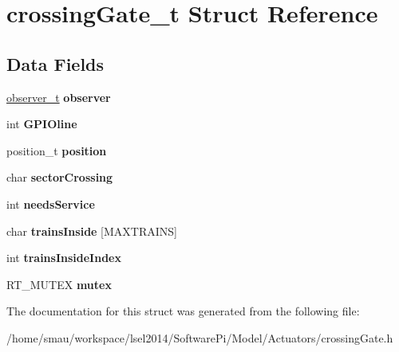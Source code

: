 \hypertarget{structcrossingGate__t}{\section{crossing\-Gate\-\_\-t Struct Reference}
\label{structcrossingGate__t}
}
\subsection*{Data Fields}
\begin{DoxyCompactItemize}
\item 
\hypertarget{structcrossingGate__t_ada9fed6bb2abed432b809e8c6bbcac45}{\hyperlink{structobserver__t}{observer\-\_\-t} {\bfseries observer}}\label{structcrossingGate__t_ada9fed6bb2abed432b809e8c6bbcac45}

\item 
\hypertarget{structcrossingGate__t_aec793529ec3db2ee4051dc5367701a30}{int {\bfseries G\-P\-I\-Oline}}\label{structcrossingGate__t_aec793529ec3db2ee4051dc5367701a30}

\item 
\hypertarget{structcrossingGate__t_aae28d4f69b591c49b978b205e7f2ca38}{position\-\_\-t {\bfseries position}}\label{structcrossingGate__t_aae28d4f69b591c49b978b205e7f2ca38}

\item 
\hypertarget{structcrossingGate__t_a6191f2a53c1ae9a277f51e58012718fd}{char {\bfseries sector\-Crossing}}\label{structcrossingGate__t_a6191f2a53c1ae9a277f51e58012718fd}

\item 
\hypertarget{structcrossingGate__t_ae5651bdf7e163f52059cb1f8f89dabc6}{int {\bfseries needs\-Service}}\label{structcrossingGate__t_ae5651bdf7e163f52059cb1f8f89dabc6}

\item 
\hypertarget{structcrossingGate__t_a8a5c43e583d48afaad918c9e719a5ad8}{char {\bfseries trains\-Inside} \mbox{[}M\-A\-X\-T\-R\-A\-I\-N\-S\mbox{]}}\label{structcrossingGate__t_a8a5c43e583d48afaad918c9e719a5ad8}

\item 
\hypertarget{structcrossingGate__t_ae48d6ced28f338fc62fa7a4dc220519f}{int {\bfseries trains\-Inside\-Index}}\label{structcrossingGate__t_ae48d6ced28f338fc62fa7a4dc220519f}

\item 
\hypertarget{structcrossingGate__t_a40f4b63f264b78d518ed6d82efca4a40}{R\-T\-\_\-\-M\-U\-T\-E\-X {\bfseries mutex}}\label{structcrossingGate__t_a40f4b63f264b78d518ed6d82efca4a40}

\end{DoxyCompactItemize}


The documentation for this struct was generated from the following file\-:\begin{DoxyCompactItemize}
\item 
/home/smau/workspace/lsel2014/\-Software\-Pi/\-Model/\-Actuators/crossing\-Gate.\-h\end{DoxyCompactItemize}
